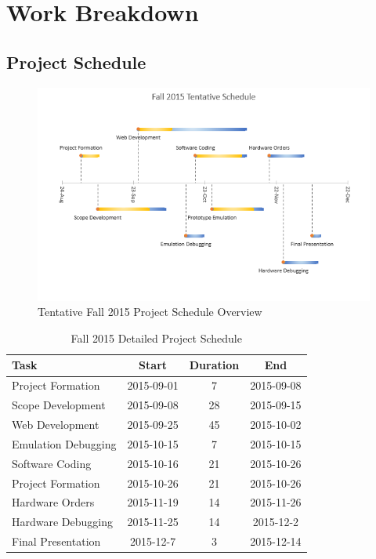 \chapter{Work Breakdown}

\section{Project Schedule}

\begin{figure}[!ht]
\centering
\includegraphics[scale=0.65]{./figures/fall-timeline}
\caption{Tentative Fall 2015 Project Schedule Overview}
\label{figure:fall-timeline}
\end{figure}

\begin{table}
\centering
\begin{tabular}{l  c  c  c}
Task & Start & Duration & End \\
\hline
Project Formation & 2015-09-01 & 7 & 2015-09-08 \\
Scope Development & 2015-09-08 & 28 & 2015-09-15 \\
Web Development & 2015-09-25 & 45 & 2015-10-02 \\
Emulation Debugging & 2015-10-15 & 7 & 2015-10-15 \\
Software Coding & 2015-10-16 & 21 & 2015-10-26 \\
Project Formation & 2015-10-26 & 21 & 2015-10-26 \\
Hardware Orders & 2015-11-19 & 14 & 2015-11-26 \\
Hardware Debugging & 2015-11-25 & 14 & 2015-12-2 \\
Final Presentation & 2015-12-7 & 3 & 2015-12-14 \\
\end{tabular}
\caption{Fall 2015 Detailed Project Schedule}
\label{table:risk}
\end{table}
\vspace{0.3cm}

